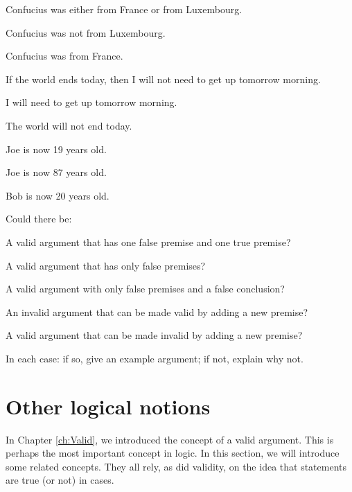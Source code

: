 \documentclass[PHIL101-Textbook.tex]{subfiles}
\begin{document}
\begin{earg}
\item Confucius was either from France or from Luxembourg.
\item Confucius was not from Luxembourg.
\item[\therefore] Confucius was from France.
\end{earg}

\begin{earg}
\item If the world ends today, then I will not need to get up tomorrow morning.
\item I will need to get up tomorrow morning.
\item[\therefore] The world will not end today.
\end{earg}

\begin{earg}
\item Joe is now 19 years old.
\item Joe is now 87 years old.
\item[\therefore] Bob is now 20 years old.
\end{earg}

\noindent\solutions
\problempart \label{pr.EnglishCombinations}
Could there be:
	\begin{earg}
		\item A valid argument that has one false premise and one true premise?
		\item A valid argument that has only false premises?
		\item A valid argument with only false premises and a false conclusion?
		\item An invalid argument that can be made valid by adding a new premise?
		\item A valid argument that can be made invalid by adding a new premise?
	\end{earg}
In each case: if so, give an example argument; if not, explain why not.


\chapter{Other logical notions}\label{ch:BasicNotions}

In Chapter \ref{ch:Valid}, we introduced the concept of a valid argument. This is perhaps the most important concept in logic. In this section, we will introduce some related concepts. They all rely, as did validity, on the idea that statements are true (or not) in cases. 
\end{document}
